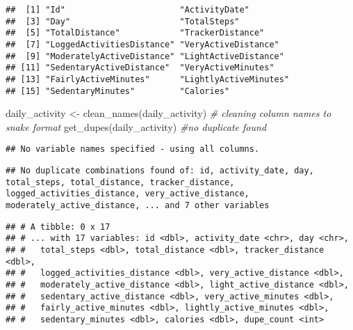 \documentclass[
]{article}
\newenvironment{Shaded}{\begin{snugshade}}{\end{snugshade}}
\newcommand{\CommentTok}[1]{\textcolor[rgb]{0.56,0.35,0.01}{\textit{#1}}}
\newcommand{\FunctionTok}[1]{\textcolor[rgb]{0.00,0.00,0.00}{#1}}
\newcommand{\NormalTok}[1]{#1}
\newcommand{\OtherTok}[1]{\textcolor[rgb]{0.56,0.35,0.01}{#1}}
\newcommand{\SpecialCharTok}[1]{\textcolor[rgb]{0.00,0.00,0.00}{#1}}
\newcommand{\StringTok}[1]{\textcolor[rgb]{0.31,0.60,0.02}{#1}}
\begin{document}
\begin{verbatim}
##  [1] "Id"                       "ActivityDate"            
##  [3] "Day"                      "TotalSteps"              
##  [5] "TotalDistance"            "TrackerDistance"         
##  [7] "LoggedActivitiesDistance" "VeryActiveDistance"      
##  [9] "ModeratelyActiveDistance" "LightActiveDistance"     
## [11] "SedentaryActiveDistance"  "VeryActiveMinutes"       
## [13] "FairlyActiveMinutes"      "LightlyActiveMinutes"    
## [15] "SedentaryMinutes"         "Calories"
\end{verbatim}

\begin{Shaded}
\begin{Highlighting}[]
\NormalTok{ daily\_activity }\OtherTok{\textless{}{-}} \FunctionTok{clean\_names}\NormalTok{(daily\_activity) }\CommentTok{\# cleaning column names to snake format}
 \FunctionTok{get\_dupes}\NormalTok{(daily\_activity) }\CommentTok{\#no duplicate found}
\end{Highlighting}
\end{Shaded}

\begin{verbatim}
## No variable names specified - using all columns.
\end{verbatim}

\begin{verbatim}
## No duplicate combinations found of: id, activity_date, day, total_steps, total_distance, tracker_distance, logged_activities_distance, very_active_distance, moderately_active_distance, ... and 7 other variables
\end{verbatim}

\begin{verbatim}
## # A tibble: 0 x 17
## # ... with 17 variables: id <dbl>, activity_date <chr>, day <chr>,
## #   total_steps <dbl>, total_distance <dbl>, tracker_distance <dbl>,
## #   logged_activities_distance <dbl>, very_active_distance <dbl>,
## #   moderately_active_distance <dbl>, light_active_distance <dbl>,
## #   sedentary_active_distance <dbl>, very_active_minutes <dbl>,
## #   fairly_active_minutes <dbl>, lightly_active_minutes <dbl>,
## #   sedentary_minutes <dbl>, calories <dbl>, dupe_count <int>
\end{verbatim}

\begin{Shaded}
\end{Shaded}
\end{document}

